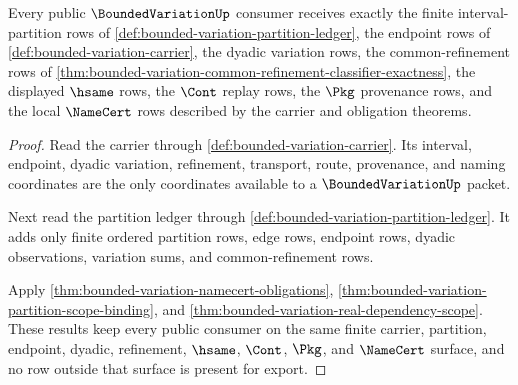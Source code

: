 \begin{theorem}
\label{thm:boundedvariation-public-namecert-export}
Every public $\BoundedVariationUp$ consumer receives exactly the finite interval-partition rows of \autoref{def:bounded-variation-partition-ledger}, the endpoint rows of \autoref{def:bounded-variation-carrier}, the dyadic variation rows, the common-refinement rows of \autoref{thm:bounded-variation-common-refinement-classifier-exactness}, the displayed $\hsame$ rows, the $\Cont$ replay rows, the $\Pkg$ provenance rows, and the local $\NameCert$ rows described by the carrier and obligation theorems.
\end{theorem}
\begin{proof}
Read the carrier through \autoref{def:bounded-variation-carrier}. Its interval, endpoint, dyadic variation, refinement, transport, route, provenance, and naming coordinates are the only coordinates available to a $\BoundedVariationUp$ packet.

Next read the partition ledger through \autoref{def:bounded-variation-partition-ledger}. It adds only finite ordered partition rows, edge rows, endpoint rows, dyadic observations, variation sums, and common-refinement rows.

Apply \autoref{thm:bounded-variation-namecert-obligations}, \autoref{thm:bounded-variation-partition-scope-binding}, and \autoref{thm:bounded-variation-real-dependency-scope}. These results keep every public consumer on the same finite carrier, partition, endpoint, dyadic, refinement, $\hsame$, $\Cont$, $\Pkg$, and $\NameCert$ surface, and no row outside that surface is present for export.
\end{proof}


